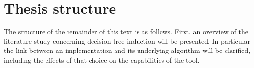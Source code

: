 \section{Thesis structure}
The structure of the remainder of this text is as follows. First, an overview of the literature study concerning decision tree induction will be presented. In particular the link between an implementation and its underlying algorithm will be clarified, including the effects of that choice on the capabilities of the tool.
